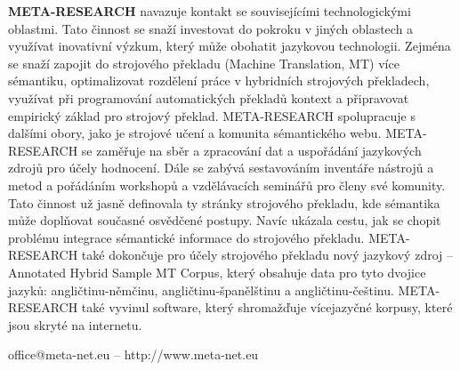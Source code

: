 \documentclass[]{../../metanetpaper}
\begin{document}
\begin{multicols}{2}
\textbf{META-RESEARCH} navazuje kontakt se souvisejícími technologickými oblastmi. Tato činnost se snaží investovat do pokroku v jiných oblastech a využívat inovativní výzkum, který může obohatit jazykovou technologii. Zejména se snaží zapojit do strojového překladu (Machine Translation, MT) více sémantiku, optimalizovat rozdělení práce v hybridních strojových překladech, využívat při programování automatických překladů kontext a připravovat empirický základ pro strojový překlad. META-RESEARCH spolupracuje s dalšími obory, jako je strojové učení a komunita sémantického webu. META-RESEARCH se zaměřuje na sběr a zpracování dat a uspořádání jazykových zdrojů pro účely hodnocení. Dále se zabývá sestavováním inventáře nástrojů a metod a pořádáním workshopů a vzdělávacích seminářů pro členy své komunity. Tato činnost už jasně definovala ty stránky strojového překladu, kde sémantika může doplňovat současné osvědčené postupy. Navíc ukázala cestu, jak se chopit problému integrace sémantické informace do strojového překladu. META-RESEARCH také dokončuje pro účely strojového překladu nový jazykový zdroj – Annotated Hybrid Sample MT Corpus, který obsahuje data pro tyto dvojice jazyků: angličtinu-němčinu, angličtinu-španělštinu a angličtinu-češtinu. META-RESEARCH také vyvinul software, který shromažďuje vícejazyčné korpusy, které jsou skryté na internetu.

\end{multicols}

\vfill
\centerline{office@meta-net.eu -- http://www.meta-net.eu}


\setcounter{section}{0}
\setcounter{figure}{0}

\cleardoublepage

  
\end{document}

